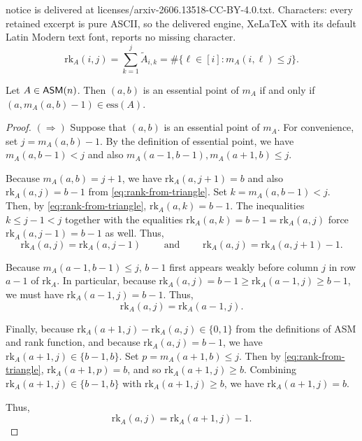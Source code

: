 \documentclass[10pt,a4paper]{amsart}
\newcommand{\asm}{{\sf ASM}}
\newcommand{\ess}{\mathrm{ess}}
\newcommand{\rk}{\mathrm{rk}}
\begin{document}
notice is delivered at licenses/arxiv-2606.13518-CC-BY-4.0.txt. Characters: every retained excerpt is pure ASCII, so the delivered engine, XeLaTeX with its default Latin Modern text font, reports no missing character.
\begin{equation}\label{eq:rank-from-triangle}
    \rk_A(i,j) = \sum_{k=1}^j \widetilde{A}_{i,k} = \#\{\ell \in [i] : m_A(i,\ell) \leq j\}.
\end{equation}

\begin{lemma}
\label{lemma:monotone_essential_set_translation}
    Let $A\in \asm(n)$.  Then $(a,b)$ is an essential point of $m_A$ if and only if $(a,m_A(a,b)-1)\in \ess(A)$.
\end{lemma}

\begin{proof}

\noindent $(\Rightarrow)$ Suppose that $(a,b)$ is an essential point of $m_A$.  For convenience, set $j=m_A(a,b)-1$.  By the definition of essential point, we have $m_A(a,b-1)< j$ and also $m_A(a-1,b-1),m_A(a+1,b)\leq j$.

Because $m_A(a,b)=j+1$, we have $\rk_A(a,j+1)=b$ and also $\rk_A(a,j)=b-1$ from \cref{eq:rank-from-triangle}.  Set $k = m_A(a,b-1)<j$.  Then, by \cref{eq:rank-from-triangle}, $\rk_A(a,k)=b-1$.  The inequalities $k \leq j-1<j$ together with the equalities $\rk_A(a,k)=b-1 = \rk_A(a,j)$ force $\rk_A(a,j-1)=b-1$ as well.  Thus, \begin{equation}\label{essential-equality-1}
    \rk_A(a,j) = \rk_A(a,j-1) \qquad \mbox{ and } \qquad \rk_A(a,j) = \rk_A(a,j+1)-1.
\end{equation}

Because $m_A(a-1,b-1)\leq j$, $b-1$ first appears weakly before column $j$ in row $a-1$ of $\rk_A$.  In particular, because $\rk_A(a,j)=b-1\geq \rk_A(a-1,j)\geq b-1$, we must have $\rk_A(a-1,j)=b-1$. Thus, \begin{equation}\label{essential-equality-2}
    \rk_A(a,j) = \rk_A(a-1,j).
\end{equation}

Finally, because $\rk_A(a+1,j)-\rk_A(a,j) \in \{0,1\}$ from the definitions of ASM and rank function, and because $\rk_A(a,j)=b-1$, we have $\rk_A(a+1,j)\in\{b-1,b\}$.  Set $p = m_A(a+1,b)\leq j$. Then by \cref{eq:rank-from-triangle}, $\rk_A(a+1,p) = b$, and so $\rk_A(a+1,j)\geq b$.  Combining $\rk_A(a+1,j)\in\{b-1,b\}$ with $\rk_A(a+1,j)\geq b$, we have $\rk_A(a+1,j) = b$.

Thus, \begin{equation}\label{essential-equality-3}
    \rk_A(a,j) = \rk_A(a+1,j)-1.
\end{equation}


\end{proof}
\end{document}
